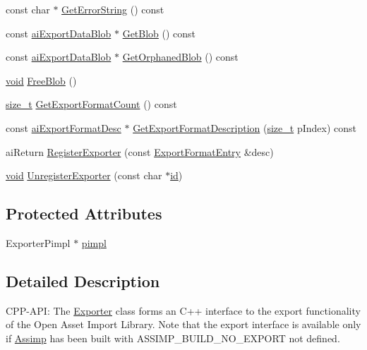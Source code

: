 \begin{DoxyCompactItemize}
\item 
const char $\ast$ \hyperlink{class_assimp_1_1_exporter_ad5dae590c3f2b8aa5fc3e2b26f7886e3}{Get\-Error\-String} () const 
\item 
const \hyperlink{structai_export_data_blob}{ai\-Export\-Data\-Blob} $\ast$ \hyperlink{class_assimp_1_1_exporter_aaee439cf6810d14eded4a12b9bc63e0b}{Get\-Blob} () const 
\item 
const \hyperlink{structai_export_data_blob}{ai\-Export\-Data\-Blob} $\ast$ \hyperlink{class_assimp_1_1_exporter_a75291079fa484c5769b36a80b1b393a5}{Get\-Orphaned\-Blob} () const 
\item 
\hyperlink{_s_d_l__opengl_8h_a3db05964a3cc4410f35b7ea2b7eb850d}{void} \hyperlink{class_assimp_1_1_exporter_a8200b618c21c272c839c37060a871d48}{Free\-Blob} ()
\item 
\hyperlink{_s_d_l__config_8h_a7c94ea6f8948649f8d181ae55911eeaf}{size\-\_\-t} \hyperlink{class_assimp_1_1_exporter_abfada264486a34c52ae43a762d5cbf01}{Get\-Export\-Format\-Count} () const 
\item 
const \hyperlink{structai_export_format_desc}{ai\-Export\-Format\-Desc} $\ast$ \hyperlink{class_assimp_1_1_exporter_a724e2a029ec38d7252f7a7169c9eb7e4}{Get\-Export\-Format\-Description} (\hyperlink{_s_d_l__config_8h_a7c94ea6f8948649f8d181ae55911eeaf}{size\-\_\-t} p\-Index) const 
\item 
ai\-Return \hyperlink{class_assimp_1_1_exporter_ae65025d7c5a06a0c3e8655585f87e1c4}{Register\-Exporter} (const \hyperlink{struct_assimp_1_1_exporter_1_1_export_format_entry}{Export\-Format\-Entry} \&desc)
\item 
\hyperlink{_s_d_l__opengl_8h_a3db05964a3cc4410f35b7ea2b7eb850d}{void} \hyperlink{class_assimp_1_1_exporter_afa5956ce18138b90396c505468d1e52b}{Unregister\-Exporter} (const char $\ast$\hyperlink{_g_l_e_w_2glew_8h_ae52362b10d585638f5b96140e90f1b7a}{id})
\end{DoxyCompactItemize}
\subsection*{Protected Attributes}
\begin{DoxyCompactItemize}
\item 
Exporter\-Pimpl $\ast$ \hyperlink{class_assimp_1_1_exporter_a75bc178ae29edc192e1c1935c31c42b2}{pimpl}
\end{DoxyCompactItemize}


\subsection{Detailed Description}
C\-P\-P-\/\-A\-P\-I\-: The \hyperlink{class_assimp_1_1_exporter}{Exporter} class forms an C++ interface to the export functionality of the Open Asset Import Library. Note that the export interface is available only if \hyperlink{namespace_assimp}{Assimp} has been built with A\-S\-S\-I\-M\-P\-\_\-\-B\-U\-I\-L\-D\-\_\-\-N\-O\-\_\-\-E\-X\-P\-O\-R\-T not defined.

